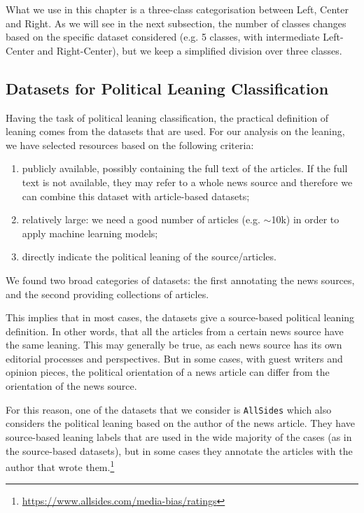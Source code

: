What we use in this chapter is a three-class categorisation between Left, Center and Right. As we will see in the next subsection, the number of classes changes based on the specific dataset considered (e.g. 5 classes, with intermediate Left-Center and Right-Center), but we keep a simplified division over three classes.


\subsection{\statusgreen Datasets for Political Leaning Classification}
\label{ssec:ps_leaning_data}

Having the task of political leaning classification, the practical definition of leaning comes from the datasets that are used.
For our analysis on the leaning, we have selected resources based on the following criteria:

\begin{enumerate}
    \item publicly available, possibly containing the full text of the articles. If the full text is not available, they may refer to a whole news source and therefore we can combine this dataset with article-based datasets;
    \item relatively large: we need a good number of articles (e.g. $\sim$10k) in order to apply machine learning models;
    \item directly indicate the political leaning of the source/articles.
\end{enumerate}

We found two broad categories of datasets: the first annotating the news sources, and the second providing collections of articles.

This implies that in most cases, the datasets give a source-based political leaning definition. In other words, that all the articles from a certain news source have the same leaning.
This may generally be true, as each news source has its own editorial processes and perspectives. But in some cases, with guest writers and opinion pieces, the political orientation of a news article can differ from the orientation of the news source.

For this reason, one of the datasets that we consider is \texttt{AllSides} which also considers the political leaning based on the author of the news article. They have source-based leaning labels that are used in the wide majority of the cases (as in the source-based datasets), but in some cases they annotate the articles with the author that wrote them.\footnote{\url{https://www.allsides.com/media-bias/ratings}}

